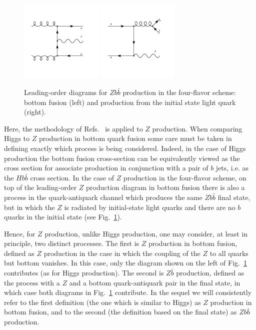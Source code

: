 \documentclass[12pt]{article}
\begin{document}
\begin{figure}
  \begin{center}
    \includegraphics[width=0.35\textwidth]{ggZbb_t.pdf}
    \includegraphics[width=0.35\textwidth]{qq_gbb.pdf} 
    \caption{\label{fig:fusvsfs} Leading-order diagrams for $Zb\bar b$ 
 production in the four-flavor scheme: bottom fusion (left)
 and production from the initial state light quark (right).
    }
  \end{center}
\end{figure}
Here, the methodology of
Refs.~\cite{Forte:2015hba,Forte:2016sja} is applied to $Z$
production. When comparing Higgs to $Z$ production in bottom quark
fusion some care must be taken in defining exactly which process is
being considered. 
Indeed, in the case of Higgs production the bottom fusion
cross-section can be equivalently viewed as the cross section for
associate production in conjunction with a pair of $b$ jets, i.e. as the
$H b\bar b$ cross section. In the case of $Z$ production in the
four-flavor scheme, on top of the leading-order $Z$ production diagram
in bottom fusion  there is also a process in the quark-antiquark
channel which produces the same $Z b\bar b$ final state, but in which
the $Z$ is radiated by  initial-state  light quarks and there are no
$b$ quarks in the initial state (see Fig.~\ref{fig:fusvsfs}).

Hence, for $Z$ production, unlike Higgs production, one may consider,
at least in principle, two distinct processes. The first is $Z$ production
in bottom fusion, defined as $Z$ production in the case in
which the coupling of the $Z$ to all quarks but bottom vanishes. In
this case, only the diagram shown on the left of
Fig.~\ref{fig:fusvsfs} contributes (as for Higgs production). The
second is $Z\bar b$ production, defined as the process with a $Z$ and a
bottom quark-antiquark pair in the final state, in which case both
diagrams in Fig.~\ref{fig:fusvsfs} contribute. In the sequel we will
consistently refer to the first definition (the one which is similar
to Higgs) as $Z$ production in bottom fusion, and to the second (the
definition based on the final state) as $Zb\bar b$ production.
\end{document}
